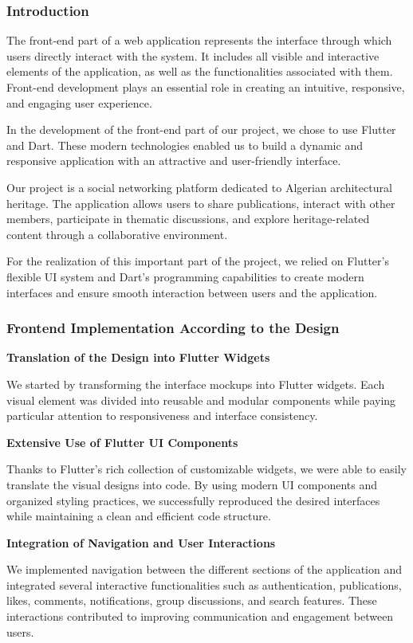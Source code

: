 \documentclass[12pt]{article}
\begin{document}
\subsubsection{Introduction}
The front-end part of a web application represents the interface through which users directly interact with the system. It includes all visible and interactive elements of the application, as well as the functionalities associated with them. Front-end development plays an essential role in creating an intuitive, responsive, and engaging user experience.

In the development of the front-end part of our project, we chose to use Flutter and Dart. These modern technologies enabled us to build a dynamic and responsive application with an attractive and user-friendly interface.

Our project is a social networking platform dedicated to Algerian architectural heritage. The application allows users to share publications, interact with other members, participate in thematic discussions, and explore heritage-related content through a collaborative environment.

For the realization of this important part of the project, we relied on Flutter’s flexible UI system and Dart’s programming capabilities to create modern interfaces and ensure smooth interaction between users and the application.

\subsubsection{Frontend Implementation According to the Design}

\textbf{Translation of the Design into Flutter Widgets}

We started by transforming the interface mockups into Flutter widgets. Each visual element was divided into reusable and modular components while paying particular attention to responsiveness and interface consistency.

\textbf{Extensive Use of Flutter UI Components}

Thanks to Flutter’s rich collection of customizable widgets, we were able to easily translate the visual designs into code. By using modern UI components and organized styling practices, we successfully reproduced the desired interfaces while maintaining a clean and efficient code structure.

\textbf{Integration of Navigation and User Interactions}

We implemented navigation between the different sections of the application and integrated several interactive functionalities such as authentication, publications, likes, comments, notifications, group discussions, and search features. These interactions contributed to improving communication and engagement between users.
\end{document}
